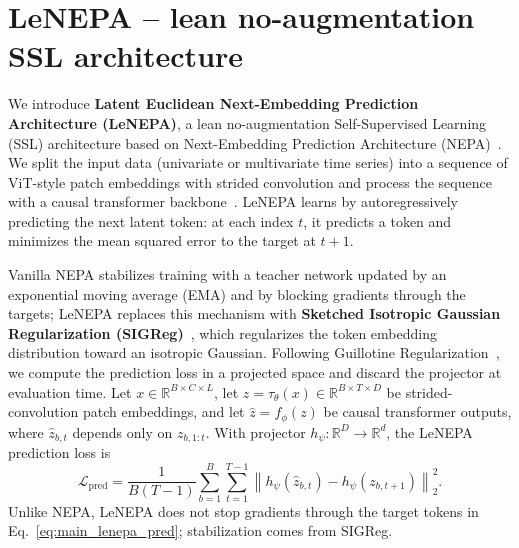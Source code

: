 \documentclass[sigconf,anonymous,review]{acmart}
\begin{document}
\section{LeNEPA -- lean no-augmentation SSL architecture}
\label{sec:method_lenepa}

We introduce \textbf{Latent Euclidean Next-Embedding Prediction Architecture (LeNEPA)}, a lean no-augmentation Self-Supervised Learning (SSL) architecture based on Next-Embedding Prediction Architecture (NEPA)~\citep{xu2025nextembeddingprediction}.
We split the input data (univariate or multivariate time series) into a sequence of ViT-style patch embeddings with strided convolution and process the sequence with a causal transformer backbone~\citep{vaswani2017attention}.
LeNEPA learns by autoregressively predicting the next latent token: at each index $t$, it predicts a token and minimizes the mean squared error to the target at $t{+}1$.

Vanilla NEPA stabilizes training with a teacher network updated by an exponential moving average (EMA) and by blocking gradients through the targets; LeNEPA replaces this mechanism with \textbf{Sketched Isotropic Gaussian Regularization (SIGReg)}~\citep{balestriero2025lejepa}, which regularizes the token embedding distribution toward an isotropic Gaussian.
Following Guillotine Regularization~\citep{bordes2022guillotine}, we compute the prediction loss in a projected space and discard the projector at evaluation time.
Let $x\in\mathbb{R}^{B\times C\times L}$, let $z=\tau_{\theta}(x)\in\mathbb{R}^{B\times T\times D}$ be strided-convolution patch embeddings, and let $\hat z=f_{\phi}(z)$ be causal transformer outputs, where $\hat z_{b,t}$ depends only on $z_{b,1:t}$.
With projector $h_{\psi}:\mathbb{R}^{D}\rightarrow\mathbb{R}^{d}$, the LeNEPA prediction loss is
\begin{equation}
  \mathcal{L}_{\mathrm{pred}}
  =
  \frac{1}{B(T-1)}\sum_{b=1}^{B}\sum_{t=1}^{T-1}
  \left\|h_{\psi}(\hat z_{b,t}) - h_{\psi}(z_{b,t+1})\right\|_2^2 .
\label{eq:main_lenepa_pred}
\end{equation}
Unlike NEPA, LeNEPA does not stop gradients through the target tokens in Eq.~\eqref{eq:main_lenepa_pred}; stabilization comes from SIGReg.
\end{document}
